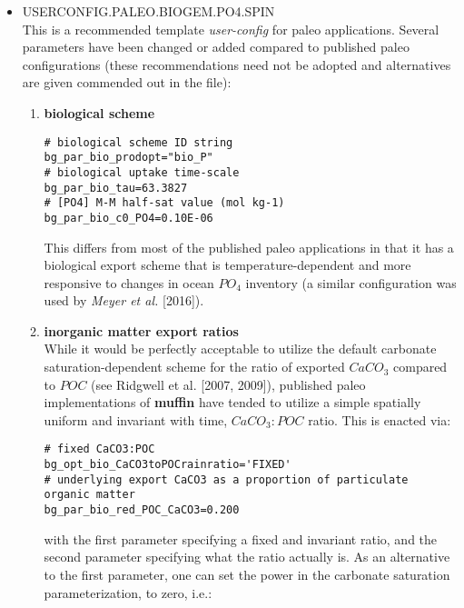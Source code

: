 \documentclass[11pt,fleqn]{book} %
\begin{document}
\begin{itemize}[noitemsep]
\vspace{2mm}
\item \textsf{\small USERCONFIG.PALEO.BIOGEM.PO4.SPIN}
\vspace{1mm}
\\This is a recommended template \textit{user-config} for paleo applications. Several parameters have been changed or added compared to published paleo configurations (these recommendations need not be adopted and alternatives are given commended out in the file):
\begin{enumerate}[noitemsep]
\vspace{1mm}
\item \textbf{biological scheme}
\small\vspace{-1mm}\begin{verbatim}
# biological scheme ID string
bg_par_bio_prodopt="bio_P"
# biological uptake time-scale
bg_par_bio_tau=63.3827
# [PO4] M-M half-sat value (mol kg-1)
bg_par_bio_c0_PO4=0.10E-06
\end{verbatim}\vspace{-1mm}\normalsize
This differs from most of the published paleo applications in that it has a biological export scheme that is temperature-dependent and more responsive to changes in ocean \(PO_{4}\) inventory (a similar configuration was used by \textit{Meyer et al.} [2016]).
\vspace{1mm}
\item \textbf{inorganic matter export ratios}
\\While it would be perfectly acceptable to utilize the default carbonate saturation-dependent scheme for the ratio of exported \(CaCO_{3}\) compared to \(POC\) (see Ridgwell et al. [2007, 2009]), published paleo implementations of \textbf{muffin} have tended to utilize a simple spatially uniform and invariant with time, \(CaCO_{3}:POC\) ratio. This is enacted via:
\small\vspace{-1mm}\begin{verbatim}
# fixed CaCO3:POC
bg_opt_bio_CaCO3toPOCrainratio='FIXED'
# underlying export CaCO3 as a proportion of particulate organic matter
bg_par_bio_red_POC_CaCO3=0.200
\end{verbatim}\vspace{-1mm}\normalsize
with the first parameter specifying a fixed and invariant ratio, and the second parameter specifying what the ratio actually is. As an alternative to the first parameter, one can set the power in the carbonate saturation parameterization, to zero, i.e.:
\small\vspace{-1mm}\begin{verbatim}

\end{verbatim}
\end{enumerate}
\end{itemize}
\end{document}
